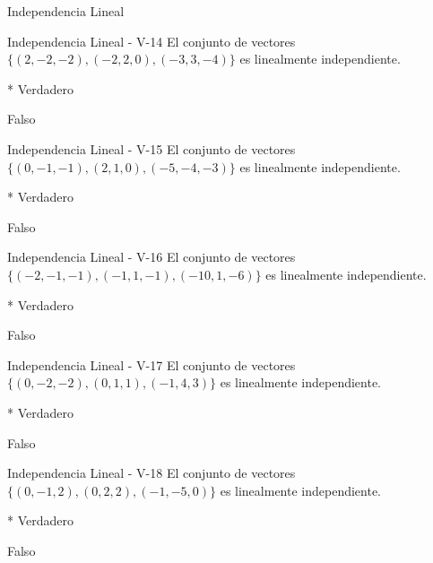 \documentclass[a4,11pt]{aleph-notas}
\begin{document}
\begin{quiz}{Independencia Lineal}
\begin{multi}[numbering = none, shuffle = false]%
    {Independencia Lineal - V-14}
    El conjunto de vectores $\{ (2,-2,-2) , (-2,2,0), (-3, 3, -4) \}$ es linealmente independiente.
    \item[]* Verdadero 
    \item[] Falso
\end{multi}

\begin{multi}[numbering = none, shuffle = false]%
    {Independencia Lineal - V-15}
    El conjunto de vectores $\{ (0,-1,-1) , (2,1,0), (-5, -4, -3) \}$ es linealmente independiente.
    \item[]* Verdadero 
    \item[] Falso
\end{multi}

\begin{multi}[numbering = none, shuffle = false]%
    {Independencia Lineal - V-16}
    El conjunto de vectores $\{ (-2,-1,-1) , (-1,1,-1), (-10, 1, -6) \}$ es linealmente independiente.
    \item[]* Verdadero 
    \item[] Falso
\end{multi}

\begin{multi}[numbering = none, shuffle = false]%
    {Independencia Lineal - V-17}
    El conjunto de vectores $\{ (0,-2,-2) , (0,1,1), (-1, 4, 3) \}$ es linealmente independiente.
    \item[]* Verdadero 
    \item[] Falso
\end{multi}

\begin{multi}[numbering = none, shuffle = false]%
    {Independencia Lineal - V-18}
    El conjunto de vectores $\{ (0,-1,2) , (0,2,2), (-1, -5, 0) \}$ es linealmente independiente.
    \item[]* Verdadero 
    \item[] Falso
\end{multi}


\end{quiz}
\end{document}

